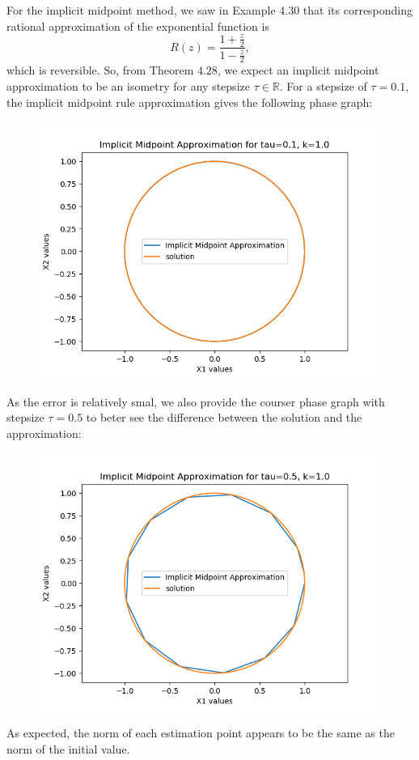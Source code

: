 \documentclass{article}
\theoremstyle{definition}
\begin{document}
\begin{itemize}
		For the implicit midpoint method, we saw in Example 4.30 that
		its corresponding
		rational approximation of the exponential function is
		\[
			R(z) = \frac{1+\frac{z}{2}}{1-\frac{z}{2}},
		\]
		which is reversible.  So, from Theorem $4.28$, we expect an
		implicit midpoint approximation to be an isometry for any
		stepsize $\tau \in \mathbb{R}$. For a stepsize of $\tau=0.1$,
		the implicit midpoint rule approximation gives the following
		phase graph:
		\begin{figure}[H]
			\includegraphics[scale=0.6]{harmonic_phase_mid_01}
		\end{figure}
		As the error is relatively smal, we also provide the
		courser phase graph with stepsize $\tau=0.5$ to beter see the
		difference between the solution and the approximation:
		\begin{figure}[H]
			\includegraphics[scale=0.6]{harmonic_phase_mid_05}
		\end{figure}
		As expected, the norm of each estimation point appears to be the
		same as the norm of the initial value.


\end{itemize}
\end{document}

